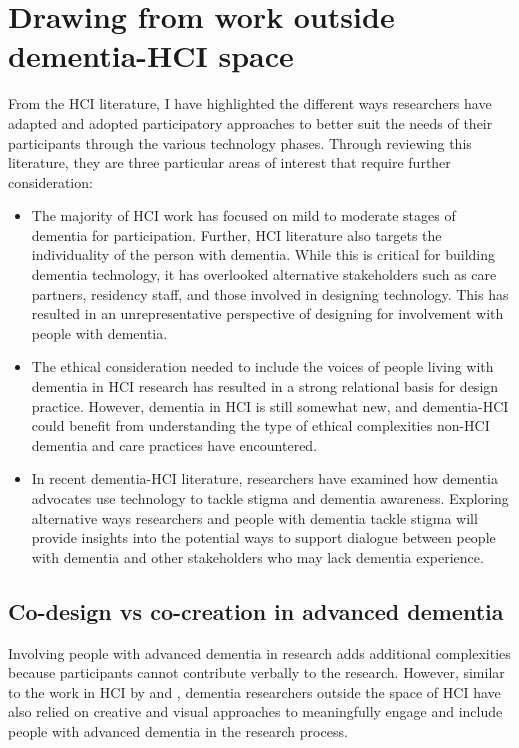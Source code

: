 \section{Drawing from work outside dementia-HCI space}
\label{BL:Outside-HCI}
From the HCI literature, I have highlighted the different ways researchers have adapted and adopted participatory approaches to better suit the needs of their participants through the various technology phases. Through reviewing this literature, they are three particular areas of interest that require further consideration:
\begin{itemize}
    \item The majority of HCI work has focused on mild to moderate stages of dementia for participation. Further, HCI literature also targets the individuality of the person with dementia. While this is critical for building dementia technology, it has overlooked alternative stakeholders such as care partners, residency staff, and those involved in designing technology. This has resulted in an unrepresentative perspective of designing for involvement with people with dementia. 
    
    \item The ethical consideration needed to include the voices of people living with dementia in HCI research has resulted in a strong relational basis for design practice. However, dementia in HCI is still somewhat new, and dementia-HCI could benefit from understanding the type of ethical complexities non-HCI dementia and care practices have encountered.
    
    \item In recent dementia-HCI literature, researchers have examined how dementia advocates use technology to tackle stigma and dementia awareness. Exploring alternative ways researchers and people with dementia tackle stigma will provide insights into the potential ways to support dialogue between people with dementia and other stakeholders who may lack dementia experience.
\end{itemize}

\subsection{Co-design vs co-creation in advanced dementia}
Involving people with advanced dementia in research adds additional complexities because participants cannot contribute verbally to the research. However, similar to the work in HCI by \cite{lazar_using_2014} and \cite{foley_student_2020}, dementia researchers outside the space of HCI have also relied on creative and visual approaches to meaningfully engage and include people with advanced dementia in the research process.

